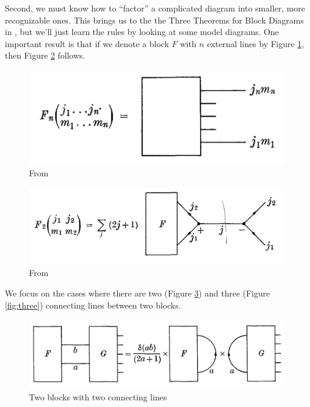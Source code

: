 \documentclass[11pt]{article}
\begin{document}
Second, we must know how to ``factor'' a complicated diagram into smaller, more recognizable ones. This brings us to the the Three Theorems for Block Diagrams in \cite{angular_momentum}, but we'll just learn the rules by looking at some model diagrams. One important result is that if we denote a block $F$ with $n$ external lines by Figure \ref{fig:block0}, then Figure \ref{fig:block1} follows.
\begin{figure}[!htb]
	\centering
	\includegraphics[scale=0.7]{block0}
	\caption{From \cite{angular_momentum}}
	\label{fig:block0}
\end{figure}
\begin{figure}[!htb]
	\centering
	\includegraphics[scale=0.7]{block1}
	\caption{From \cite{angular_momentum}}
	\label{fig:block1}
\end{figure}



We focus on the cases where there are two (Figure \ref{fig:two}) and three (Figure \ref{fig:three}) connecting lines between two blocks. 
	\begin{figure}[!htb]
		\centering
		\includegraphics[scale=0.7]{blocks_two_lines}
		\caption{Two blocks with two connecting lines \cite{angular_momentum}}
		\label{fig:two}
	\end{figure}
	
\end{document}
